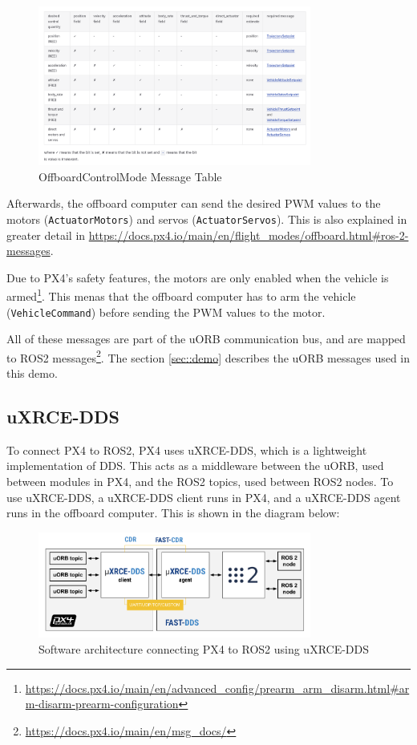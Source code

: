 \documentclass[a4paper]{article}
\begin{document}
\begin{figure}[H]
    \centering
    \includegraphics[width=0.8\textwidth]{imgs/OffboardControlMode authority table.png}
    \caption{OffboardControlMode Message Table}
    \label{fig:offboard_control_mode}
\end{figure}

Afterwards, the offboard computer can send the desired PWM values to the motors (\verb|ActuatorMotors|) and servos (\verb|ActuatorServos|). 
This is also explained in greater detail in \url{https://docs.px4.io/main/en/flight_modes/offboard.html#ros-2-messages}. 

Due to PX4's safety features, the motors are only enabled when the vehicle is armed\footnote{\url{https://docs.px4.io/main/en/advanced_config/prearm_arm_disarm.html\#arm-disarm-prearm-configuration}}. 
This menas that the offboard computer has to arm the vehicle (\verb|VehicleCommand|) before sending the PWM values to the motor. 

All of these messages are part of the uORB communication bus, and are mapped to ROS2 messages\footnote{\url{https://docs.px4.io/main/en/msg_docs/}}. 
The section \ref{sec::demo} describes the uORB messages used in this demo.

\subsection{uXRCE-DDS}

To connect PX4 to ROS2, PX4 uses uXRCE-DDS, which is a lightweight implementation of DDS. 
This acts as a middleware between the uORB, used between modules in PX4, and the ROS2 topics, used between ROS2 nodes. 
To use uXRCE-DDS, a uXRCE-DDS client runs in PX4, and a uXRCE-DDS agent runs in the offboard computer. 
This is shown in the diagram below: 

\begin{figure}[H]
    \centering
    \includegraphics[width=0.8\textwidth]{imgs/architecture_xrce_dds_ros2.png}
    \caption{Software architecture connecting PX4 to ROS2 using uXRCE-DDS}
    \label{fig:architecture_xrce_dds_ros2}
\end{figure}
\end{document}
